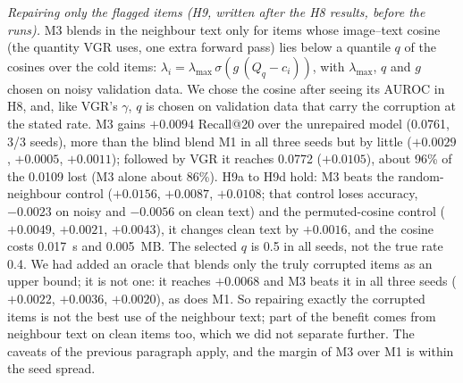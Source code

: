 \documentclass[conference]{IEEEtran}
\begin{document}
\emph{Repairing only the flagged items (H9, written after the H8 results, before the runs).} M3 blends in the neighbour text only for items whose image--text cosine (the quantity VGR uses, one extra forward pass) lies below a quantile $q$ of the cosines over the cold items: $\lambda_i = \lambda_{\max}\,\sigma(g\,(Q_q - c_i))$, with $\lambda_{\max}$, $q$ and $g$ chosen on noisy validation data. We chose the cosine after seeing its AUROC in H8, and, like VGR's $\gamma$, $q$ is chosen on validation data that carry the corruption at the stated rate. M3 gains $+0.0094$ Recall@20 over the unrepaired model (0.0761, 3/3 seeds), more than the blind blend M1 in all three seeds but by little ($+0.0029$, $+0.0005$, $+0.0011$); followed by VGR it reaches 0.0772 ($+0.0105$), about 96\% of the 0.0109 lost (M3 alone about 86\%). H9a to H9d hold: M3 beats the random-neighbour control ($+0.0156$, $+0.0087$, $+0.0108$; that control loses accuracy, $-0.0023$ on noisy and $-0.0056$ on clean text) and the permuted-cosine control ($+0.0049$, $+0.0021$, $+0.0043$), it changes clean text by $+0.0016$, and the cosine costs 0.017~s and 0.005~MB. The selected $q$ is 0.5 in all seeds, not the true rate 0.4. We had added an oracle that blends only the truly corrupted items as an upper bound; it is not one: it reaches $+0.0068$ and M3 beats it in all three seeds ($+0.0022$, $+0.0036$, $+0.0020$), as does M1. So repairing exactly the corrupted items is not the best use of the neighbour text; part of the benefit comes from neighbour text on clean items too, which we did not separate further. The caveats of the previous paragraph apply, and the margin of M3 over M1 is within the seed spread.
\end{document}
